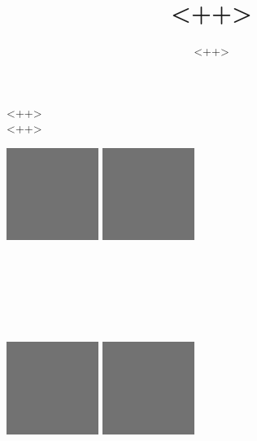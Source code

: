 \documentclass[11pt, a4paper]{article}
\title{<++>}
\author{<++>}
\begin{document}
\makeatletter
\begin{titlepage}
  \centering

  {\large \textsc{<++>}}\\
  \textsc{<++>}\\

  \vspace{1cm}

  \includegraphics[width=3cm]{images/logo.png}
  \hfill
  \includegraphics[width=3cm]{images/logo.png}\\

  \vspace{1cm}

  {\large \textbf{\@date\\<++>}}\\

  \vfill

  {\LARGE\sffamily \textbf{\@title}}\\
  \vspace{2em}
  {\large \@author}\\
  \vspace{8em}

  \vfill

  \includegraphics[height=3cm]{images/logo.png}
  \hfill
  \includegraphics[height=3cm]{images/logo.png}
\end{titlepage}
\makeatother
\end{document}
